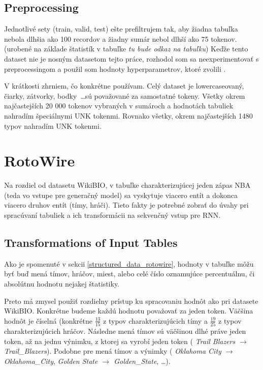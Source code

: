 \subsection{Preprocessing}

Jednotlivé sety (train, valid, test) ešte prefiltrujem tak, aby žiadna tabuľka nebola dlhšia ako 100 recordov a žiadny sumár nebol dlhší ako 75 tokenov. (urobené na základe štatistík v tabuľke \emph{tu bude odkaz na tabuľku}) Keďže tento dataset nie je nosným datasetom tejto práce, rozhodol som sa neexperimentovať s preprocessingom a použil som hodnoty hyperparametrov, ktoré zvolili \citep{liu2017tabletotext}.

V krátkosti zhrniem, čo konkrétne používam. Celý dataset je lowercaseovaný, čiarky, zátvorky, bodky \dots sú považované za samostatné tokeny. Všetky okrem najčastejších 20 000 tokenov vybraných \citep{liu2017tabletotext} v sumároch a hodnotách tabuliek nahradím špeciálnymi UNK tokenmi. Rovnako všetky, okrem najčastejších 1480 typov nahradím UNK tokenmi.

\section{RotoWire}

Na rozdiel od datasetu WikiBIO, v tabuľke charakterizujúcej jeden zápas NBA (teda vo vstupe pre generačný model) sa vyskytuje viacero entít a dokonca viacero druhov entít (tímy, hráči). Tieto fakty je potrebné zobrať do úvahy pri spracúvaní tabuliek a ich transformácii na sekvenčný vstup pre RNN.

\subsection{Transformations of Input Tables}

Ako je spomenuté v sekcii \ref{structured_data_rotowire}, hodnoty v tabuľke môžu byť buď mená tímov, hráčov, miest, alebo celé číslo oznamujúce percentuálnu, či absolútnu hodnotu nejakej štatistiky.

Preto má zmysel použiť rozdielny prístup ku spracovaniu hodnôt ako pri datasete WikiBIO. Konkrétne budeme každú hodnotu považovať za jeden token. Väčšina hodnôt je číselná (konkrétne $\frac{13}{15}$ z typov charakterizujúcich tímy a $\frac{19}{25}$ z typov charakterizujúcich hráčov. Následne mená tímov sú väčšinou dlhé práve jeden token, až na jednu výnimku, z ktorej sa vyrobí jeden token ( \emph{Trail Blazers $\rightarrow$ Trail\_Blazers}). Podobne pre mená tímov a výnimky ( \emph{Oklahoma City $\rightarrow$ Oklahoma\_City}, \emph{Golden State $\rightarrow$ Golden\_State}, \dots).

